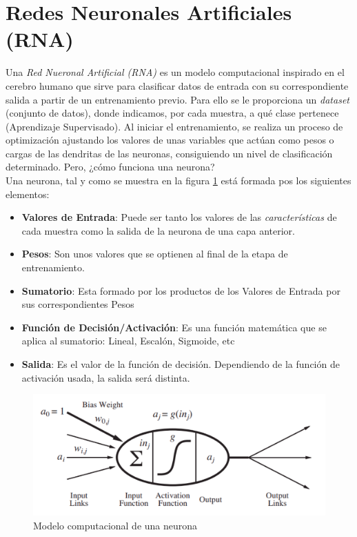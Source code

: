 \section{Redes Neuronales Artificiales (RNA)}
\label{sec:redes_neuronales}

Una \textit{Red Nueronal Artificial (RNA)} es un modelo computacional inspirado en el cerebro humano que sirve para clasificar datos de entrada con su correspondiente salida a partir de un entrenamiento previo. Para ello se le proporciona un \textit{dataset} (conjunto de datos), donde indicamos, por cada muestra, a qué clase pertenece (Aprendizaje Supervisado). Al iniciar el entrenamiento, se realiza un proceso de optimización ajustando los valores de unas variables que actúan como pesos o cargas de las dendritas de las neuronas, consiguiendo un nivel de clasificación determinado. Pero, ¿cómo funciona una neurona?\\

Una neurona, tal y como se muestra en la figura \ref{fig:neurona} está formada pos los siguientes elementos:
\begin{itemize}
	\item \textbf{Valores de Entrada}: Puede ser tanto los valores de las \textit{características} de cada muestra como la salida de la neurona de una capa anterior.
	\item \textbf{Pesos}: Son unos valores que se optienen al final de la etapa de entrenamiento.
	\item \textbf{Sumatorio}: Esta formado por los productos de los Valores de Entrada por sus correspondientes Pesos
	\item \textbf{Función de Decisión/Activación}: Es una función matemática que se aplica al sumatorio: Lineal, Escalón, Sigmoide, etc
	\item \textbf{Salida}: Es el valor de la función de decisión. Dependiendo de la función de activación usada, la salida será distinta.
\end{itemize}

\begin{figure}[H]
  \begin{center}
    \includegraphics[width=15cm]{imagenes/cap1/neurona.png}
  \end{center}
  \caption[Modelo computacional de una neurona]{Modelo computacional de una neurona \cite{AIMA}}
  \label{fig:neurona}
\end{figure}

